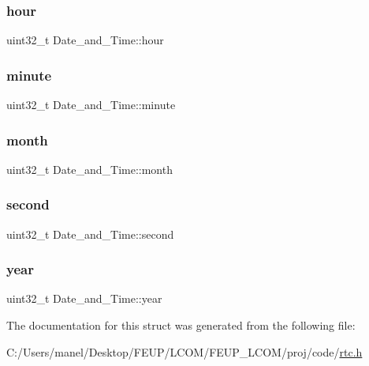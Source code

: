 \subsubsection{\texorpdfstring{hour}{hour}}
{\footnotesize\ttfamily uint32\+\_\+t Date\+\_\+and\+\_\+\+Time\+::hour}

\mbox{\label{struct_date__and___time_a748e5a8772cc82138e56fd54fd4ae7a8}} 
\subsubsection{\texorpdfstring{minute}{minute}}
{\footnotesize\ttfamily uint32\+\_\+t Date\+\_\+and\+\_\+\+Time\+::minute}

\mbox{\label{struct_date__and___time_a7c3abab3a768559d283075753cfa822c}} 
\subsubsection{\texorpdfstring{month}{month}}
{\footnotesize\ttfamily uint32\+\_\+t Date\+\_\+and\+\_\+\+Time\+::month}

\mbox{\label{struct_date__and___time_aed8b75bcb223dd5828a2b8ed0b5c9eec}} 
\subsubsection{\texorpdfstring{second}{second}}
{\footnotesize\ttfamily uint32\+\_\+t Date\+\_\+and\+\_\+\+Time\+::second}

\mbox{\label{struct_date__and___time_ade104bcb05e7817e04904bee37fc1acb}} 
\subsubsection{\texorpdfstring{year}{year}}
{\footnotesize\ttfamily uint32\+\_\+t Date\+\_\+and\+\_\+\+Time\+::year}



The documentation for this struct was generated from the following file\+:\begin{DoxyCompactItemize}
\item 
C\+:/\+Users/manel/\+Desktop/\+F\+E\+U\+P/\+L\+C\+O\+M/\+F\+E\+U\+P\+\_\+\+L\+C\+O\+M/proj/code/\mbox{\hyperlink{rtc_8h}{rtc.\+h}}\end{DoxyCompactItemize}
